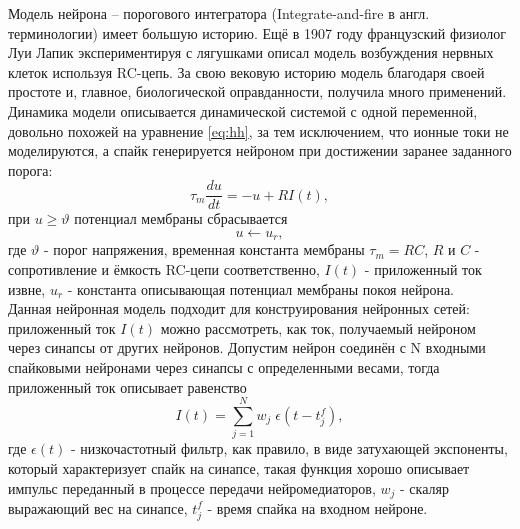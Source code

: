 \documentclass[a4paper,10pt]{article}
\begin{document}
\indent Модель нейрона -- порогового интегратора (Integrate-and-fire в англ. терминологии) имеет большую историю. Ещё в 1907 году 	французский физиолог Луи Лапик экспериментируя с лягушками описал модель возбуждения нервных клеток используя RC-цепь\cite{Lapicque}. За свою вековую историю модель благодаря своей простоте и, главное, биологической оправданности, получила много применений.\\
   \indent Динамика модели описывается динамической системой с одной переменной, довольно похожей на уравнение \eqref{eq:hh}, за тем исключением, что ионные токи не моделируются, а спайк генерируется нейроном при достижении заранее заданного порога:\\
   \begin{equation}\label{eq:iaf}
   \tau_{m}\frac{du}{dt} =-u+R I(t),
   \end{equation}
при $u \geq \vartheta$ потенциал мембраны сбрасывается   
   \begin{equation}\label{eq:iaf_reset}
   u \leftarrow u_{r},
   \end{equation}
где $\vartheta$ - порог напряжения, временная константа мембраны $\tau_{m}=RC$, $R$ и $C$ - сопротивление и ёмкость RC-цепи соответственно, $I(t)$ - приложенный ток извне, $u_{r}$ - константа описывающая потенциал мембраны покоя нейрона.\\   
\indent Данная нейронная модель подходит для конструирования нейронных сетей: приложенный ток $I(t)$ можно рассмотреть, как ток, получаемый нейроном через синапсы от других нейронов. Допустим нейрон соединён с N входными спайковыми нейронами через синапсы с определенными весами, тогда приложенный ток описывает равенство
\begin{equation}\label{eq:iaf_syn}
I(t) = \sum_{j=1}^{N} w_{j}\; \epsilon(t-t_{j}^{f}),
\end{equation}
где $\epsilon(t)$ - низкочастотный фильтр, как правило, в виде затухающей экспоненты, который характеризует спайк на синапсе, такая функция хорошо описывает импульс переданный в процессе передачи нейромедиаторов, $w_{j}$ - скаляр выражающий вес на синапсе, $t_{j}^{f}$ - время спайка на входном нейроне.\\
\end{document}
